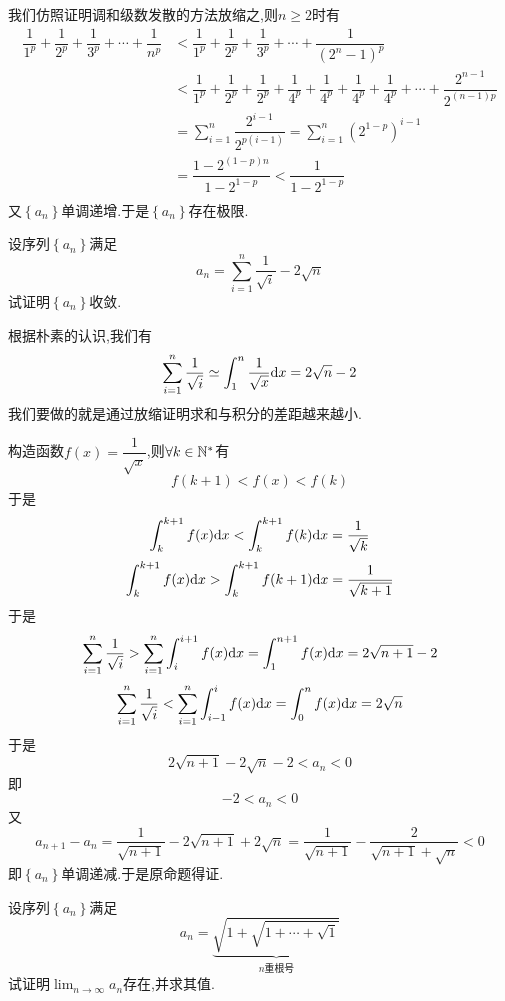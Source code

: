 \documentclass{ctexart}
\begin{document}
\begin{solution}[Proof.]
    我们仿照证明调和级数发散的方法放缩之,则$n\geqslant2$时有
    $$\begin{aligned}
        \dfrac{1}{1^p}+\dfrac{1}{2^p}+\dfrac{1}{3^p}+\cdots+\dfrac{1}{n^p}
        &< \dfrac{1}{1^p}+\dfrac{1}{2^p}+\dfrac{1}{3^p}+\cdots+\dfrac{1}{\left(2^n-1\right)^p} \\
        &< \dfrac{1}{1^p}+\dfrac{1}{2^p}+\dfrac{1}{2^p}+\dfrac{1}{4^p}+\dfrac{1}{4^p}+\dfrac{1}{4^p}+\dfrac{1}{4^p}+\cdots+\dfrac{2^{n-1}}{2^{(n-1)p}} \\
        &= \sum_{i=1}^{n}\dfrac{2^{i-1}}{2^{p(i-1)}}=\sum_{i=1}^{n}\left(2^{1-p}\right)^{i-1} \\
        &= \dfrac{1-2^{(1-p)n}}{1-2^{1-p}}<\dfrac{1}{1-2^{1-p}}\\
    \end{aligned}$$
    又$\left\{a_n\right\}$单调递增.于是$\left\{a_n\right\}$存在极限.
\end{solution}
\begin{problem}[Problem 4.]
    设序列$\left\{a_n\right\}$满足$$a_n=\sum_{i=1}^{n}\dfrac{1}{\sqrt{i}}-2\sqrt{n}$$
    试证明$\left\{a_n\right\}$收敛.
\end{problem}
\begin{analyze}[Analysis.]
    根据朴素的认识,我们有
    $$\sum_{i=1}^n\dfrac{1}{\sqrt{i}}\simeq\int_1^n\dfrac{1}{\sqrt{x}}\mathrm{d} x=2\sqrt{n}-2$$
    我们要做的就是通过放缩证明求和与积分的差距越来越小.
\end{analyze}
\begin{solution}[Proof.]
    构造函数$f(x)=\dfrac{1}{\sqrt{x}}$,则$\forall k\in\mathbb{N}^*$有
    $$f(k+1)<f(x)<f(k)$$
    于是
    $$\int_k^{k+1}f(x)\mathrm{d} x<\int_k^{k+1}f(k)\mathrm{d} x=\dfrac{1}{\sqrt{k}}$$
    $$\int_k^{k+1}f(x)\mathrm{d} x>\int_k^{k+1}f(k+1)\mathrm{d} x=\dfrac{1}{\sqrt{k+1}}$$
    于是$$\sum_{i=1}^{n}\dfrac{1}{\sqrt{i}}>\sum_{i=1}^{n}\int_i^{i+1}f(x)\mathrm{d} x=\int_{1}^{n+1}f(x)\mathrm{d} x=2\sqrt{n+1}-2$$
    $$\sum_{i=1}^{n}\dfrac{1}{\sqrt{i}}<\sum_{i=1}^{n}\int_{i-1}^{i}f(x)\mathrm{d} x=\int_{0}^{n}f(x)\mathrm{d} x=2\sqrt{n}$$
    于是$$2\sqrt{n+1}-2\sqrt{n}-2<a_n<0$$
    即$$-2<a_n<0$$
    又$$a_{n+1}-a_n=\dfrac{1}{\sqrt{n+1}}-2\sqrt{n+1}+2\sqrt{n}=\dfrac{1}{\sqrt{n+1}}-\dfrac{2}{\sqrt{n+1}+\sqrt{n}}<0$$
    即$\left\{a_n\right\}$单调递减.于是原命题得证.
\end{solution}
\begin{problem}[Problem 5.]
    设序列$\left\{a_n\right\}$满足$$a_n=\underbrace{\sqrt{1+\sqrt{1+\cdots+\sqrt{1}}}}_{n\text{重根号}}$$
    试证明$\displaystyle\lim_{n\to\infty}a_n$存在,并求其值.
\end{problem}
\end{document}

